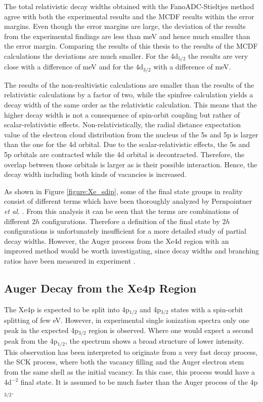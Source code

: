 The total relativistic decay widths obtained with the FanoADC-Stieltjes
method agree with
both the experimental results and the \ac{MCDF} results within the error margins.
Even though the error margins are large, the deviation of the results
from the experimental findings are
less than \unit[52]{meV} and hence much smaller than the error margin. 
Comparing the results of this thesis to the results of the \ac{MCDF} calculations
the deviations are much smaller. For the 4d$_{5/2}$
the results are very close with a difference of \unit[2]{meV} and for the
4d$_{3/2}$ with a difference of \unit[10]{meV}.

The results of the non-realtivistic calculations are smaller than the
results of the relativistic calculations by a factor of two,
while the spinfree calculation yields a decay width
of the same order as the relativistic calculation. This means that the higher
decay width is not a consequence of spin-orbit coupling but rather of
scalar-relativistic effects. Non-relativistically, the radial
distance expectation value
of the electron cloud distribution
from the nucleus of the 5s and 5p is larger than the one for the 4d orbital. Due to
the scalar-relativistic effects, the 5s and 5p orbitals are contracted while the 4d
orbital is decontracted. Therefore, the overlap between those orbitals is larger
as is their possible interaction. Hence, the decay width including both
kinds of vacancies is increased.

As shown in Figure \ref{figure:Xe_sdip}, some of the final state groups
in reality consist of
different terms which have been thoroughly analyzed by
Pernpointner \textit{et al.} \cite{Pernpointner12_2}. From this analysis
it can be seen that the terms are combinations of different $2h$
configurations. Therefore a definition of the final state by $2h$
configurations is unfortunately insufficient for a more detailed
study of partial decay widths.
However, the Auger process from the Xe4d region with an improved method
would be worth investigating, since decay widths and branching ratios have been
measured in experiment \cite{Aksela94}.




\subsection{Auger Decay from the Xe4p Region}
The Xe4p is expected to be split into 4p$_{1/2}$ and 4p$_{3/2}$ states with
a spin-orbit splitting of few \unit{eV}. However, in experimental single
ionization spectra only one peak in the expected 4p$_{3/2}$ region is observed.
Where one would expect a second peak from the 4p$_{1/2}$, the spectrum shows
a broad structure of lower intensity. This observation has been interpreted
to originate from a very fast decay process, the \acl{SCK} process, where both the
vacancy filling and the Auger electron stem from the same shell as the initial
vacancy. In this case, this process would have a 4d$^{-2}$ final state.
It is assumed to be much faster than the Auger process
of the 4p$_{3/2}$. 

